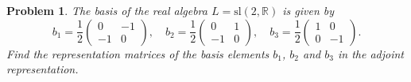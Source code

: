 \documentclass[UTF8,10pt,a4paper]{article}
\theoremstyle{Problem}
\newtheorem{prob}{Problem}
\theoremstyle{Solution}
\begin{document}
\thispagestyle{FirstPageStyle}
\begin{prob}
    The basis of the real algebra $L=\text{sl}(2,\mathbb{R})$ is given by
    \[
        b_1=\frac{1}{2}\left(\begin{matrix}
            0&-1\\
            -1&0
        \end{matrix}\right),\quad b_2=\frac{1}{2}\left(\begin{matrix}
            0&1\\
            -1&0
        \end{matrix}\right),\quad b_3=\frac{1}{2}\left(\begin{matrix}
            1&0\\
            0&-1
        \end{matrix}\right).
    \]
    Find the representation matrices of the basis elements $b_1$, $b_2$ and $b_3$ in the adjoint representation.
\end{prob}
\end{document}
